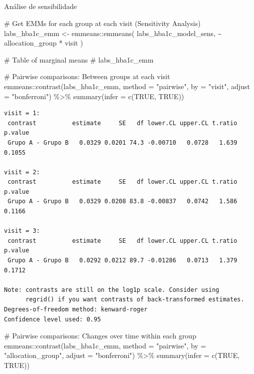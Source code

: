 \documentclass[
  12pt,
]{article}
\makeatletter
\let\oldsubparagraph\subparagraph
\renewcommand{\subparagraph}{
    \@ifstar
      \xxxSubParagraphStar
      \xxxSubParagraphNoStar
  }
\newcommand{\xxxSubParagraphStar}[1]{\oldsubparagraph*{#1}\mbox{}}
\newcommand{\xxxSubParagraphNoStar}[1]{\oldsubparagraph{#1}\mbox{}}
\newenvironment{Shaded}{\begin{snugshade}}{\end{snugshade}}
\newcommand{\AttributeTok}[1]{\textcolor[rgb]{0.40,0.45,0.13}{#1}}
\newcommand{\CommentTok}[1]{\textcolor[rgb]{0.37,0.37,0.37}{#1}}
\newcommand{\ConstantTok}[1]{\textcolor[rgb]{0.56,0.35,0.01}{#1}}
\newcommand{\FunctionTok}[1]{\textcolor[rgb]{0.28,0.35,0.67}{#1}}
\newcommand{\NormalTok}[1]{\textcolor[rgb]{0.00,0.23,0.31}{#1}}
\newcommand{\OtherTok}[1]{\textcolor[rgb]{0.00,0.23,0.31}{#1}}
\newcommand{\SpecialCharTok}[1]{\textcolor[rgb]{0.37,0.37,0.37}{#1}}
\newcommand{\StringTok}[1]{\textcolor[rgb]{0.13,0.47,0.30}{#1}}
\makeatother
\begin{document}
\subparagraph{Análise de
sensibilidade}\label{anuxe1lise-de-sensibilidade-9}

\begin{Shaded}
\begin{Highlighting}[]
\CommentTok{\# Get EMMs for each group at each visit (Sensitivity Analysis)}
\NormalTok{labs\_hba1c\_emm }\OtherTok{\textless{}{-}}\NormalTok{ emmeans}\SpecialCharTok{::}\FunctionTok{emmeans}\NormalTok{(}
\NormalTok{    labs\_hba1c\_model\_sens, }
    \SpecialCharTok{\textasciitilde{}}\NormalTok{ allocation\_group }\SpecialCharTok{*}\NormalTok{ visit}
\NormalTok{)}

\CommentTok{\# Table of marginal means}
\CommentTok{\# labs\_hba1c\_emm}

\CommentTok{\# Pairwise comparisons: Between groups at each visit}
\NormalTok{emmeans}\SpecialCharTok{::}\FunctionTok{contrast}\NormalTok{(labs\_hba1c\_emm,}
\AttributeTok{method =} \StringTok{"pairwise"}\NormalTok{, }\AttributeTok{by =} \StringTok{"visit"}\NormalTok{,}
\AttributeTok{adjust =} \StringTok{"bonferroni"}\NormalTok{) }\SpecialCharTok{\%\textgreater{}\%} \FunctionTok{summary}\NormalTok{(}\AttributeTok{infer =} \FunctionTok{c}\NormalTok{(}\ConstantTok{TRUE}\NormalTok{, }\ConstantTok{TRUE}\NormalTok{))}
\end{Highlighting}
\end{Shaded}

\begin{verbatim}
visit = 1:
 contrast          estimate     SE   df lower.CL upper.CL t.ratio p.value
 Grupo A - Grupo B   0.0329 0.0201 74.3 -0.00710   0.0728   1.639  0.1055

visit = 2:
 contrast          estimate     SE   df lower.CL upper.CL t.ratio p.value
 Grupo A - Grupo B   0.0329 0.0208 83.8 -0.00837   0.0742   1.586  0.1166

visit = 3:
 contrast          estimate     SE   df lower.CL upper.CL t.ratio p.value
 Grupo A - Grupo B   0.0292 0.0212 89.7 -0.01286   0.0713   1.379  0.1712

Note: contrasts are still on the log1p scale. Consider using
      regrid() if you want contrasts of back-transformed estimates. 
Degrees-of-freedom method: kenward-roger 
Confidence level used: 0.95 
\end{verbatim}

\begin{Shaded}
\begin{Highlighting}[]
\CommentTok{\# Pairwise comparisons: Changes over time within each group}
\NormalTok{emmeans}\SpecialCharTok{::}\FunctionTok{contrast}\NormalTok{(labs\_hba1c\_emm,}
\AttributeTok{method =} \StringTok{"pairwise"}\NormalTok{, }\AttributeTok{by =} \StringTok{"allocation\_group"}\NormalTok{,}
\AttributeTok{adjust =} \StringTok{"bonferroni"}\NormalTok{) }\SpecialCharTok{\%\textgreater{}\%} \FunctionTok{summary}\NormalTok{(}\AttributeTok{infer =} \FunctionTok{c}\NormalTok{(}\ConstantTok{TRUE}\NormalTok{, }\ConstantTok{TRUE}\NormalTok{))}
\end{Highlighting}
\end{Shaded}
\end{document}
